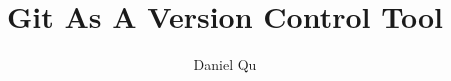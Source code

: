  



\setlength{\parskip}{1em}

\onehalfspacing



\ifTitlePage
	
\fi

\ifLetterSubmittal
	
\fi

\title{Git As A Version Control Tool}
\author{Daniel Qu}

\unless\ifTitlePage
	\maketitle
\fi


\printbibliography


